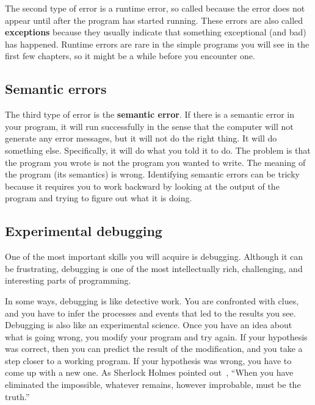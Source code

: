 The second type of error is a runtime error, so called because the
error does not appear until after the program has started running.
These errors are also called {\bf exceptions} because they usually
indicate that something exceptional (and bad) has happened.
Runtime errors are rare in the simple programs you will see in the
first few chapters, so it might be a while before you encounter one.


\subsection{Semantic errors}

The third type of error is the {\bf semantic error}.  If there is a
semantic error in your program, it will run successfully in the sense
that the computer will not generate any error messages, but it will
not do the right thing.  It will do something else.  Specifically, it
will do what you told it to do.
The problem is that the program you wrote is not the program you
wanted to write.  The meaning of the program (its semantics) is wrong.
Identifying semantic errors can be tricky because it requires you to work
backward by looking at the output of the program and trying to figure
out what it is doing.

\subsection{Experimental debugging}

One of the most important skills you will acquire is debugging.
Although it can be frustrating, debugging is one of the most
intellectually rich, challenging, and interesting parts of
programming.


In some ways, debugging is like detective work.  You are confronted
with clues, and you have to infer the processes and events that led
to the results you see.
Debugging is also like an experimental science.  Once you have an idea
about what is going wrong, you modify your program and try again.  If
your hypothesis was correct, then you can predict the result of the
modification, and you take a step closer to a working program.  If
your hypothesis was wrong, you have to come up with a new one.  As
Sherlock Holmes pointed out~\parencite{doyle2010sign}, ``When you have eliminated the
impossible, whatever remains, however improbable, must be the truth.''


